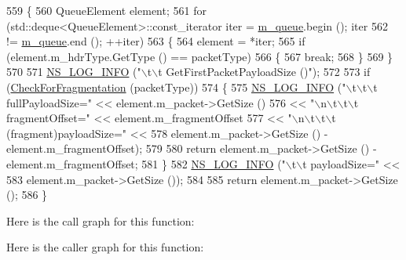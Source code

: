 \begin{DoxyCode}
559 \{
560   QueueElement element;
561   \textcolor{keywordflow}{for} (std::deque<QueueElement>::const\_iterator iter = \hyperlink{classns3_1_1WimaxMacQueue_ad372c20acfe0acf6df6280662d63bdae}{m\_queue}.begin (); iter
562        != \hyperlink{classns3_1_1WimaxMacQueue_ad372c20acfe0acf6df6280662d63bdae}{m\_queue}.end (); ++iter)
563     \{
564       element = *iter;
565       \textcolor{keywordflow}{if} (element.m\_hdrType.GetType () == packetType)
566         \{
567           \textcolor{keywordflow}{break};
568         \}
569     \}
570 
571   \hyperlink{group__logging_gafbd73ee2cf9f26b319f49086d8e860fb}{NS\_LOG\_INFO} (\textcolor{stringliteral}{"\(\backslash\)t\(\backslash\)t GetFirstPacketPayloadSize ()"});
572 
573   \textcolor{keywordflow}{if} (\hyperlink{classns3_1_1WimaxMacQueue_aba14f6efd4ebb33ac03afd4bbc1461b6}{CheckForFragmentation} (packetType))
574     \{
575       \hyperlink{group__logging_gafbd73ee2cf9f26b319f49086d8e860fb}{NS\_LOG\_INFO} (\textcolor{stringliteral}{"\(\backslash\)t\(\backslash\)t\(\backslash\)t fullPayloadSize="} << element.m\_packet->GetSize ()
576                                              << \textcolor{stringliteral}{"\(\backslash\)n\(\backslash\)t\(\backslash\)t\(\backslash\)t fragmentOffset="} << element.m\_fragmentOffset
577                                              << \textcolor{stringliteral}{"\(\backslash\)n\(\backslash\)t\(\backslash\)t\(\backslash\)t (fragment)payloadSize="} <<
578                    element.m\_packet->GetSize () - element.m\_fragmentOffset);
579 
580       \textcolor{keywordflow}{return} element.m\_packet->GetSize () - element.m\_fragmentOffset;
581     \}
582   \hyperlink{group__logging_gafbd73ee2cf9f26b319f49086d8e860fb}{NS\_LOG\_INFO} (\textcolor{stringliteral}{"\(\backslash\)t\(\backslash\)t payloadSize="} <<
583                element.m\_packet->GetSize ());
584 
585   \textcolor{keywordflow}{return} element.m\_packet->GetSize ();
586 \}
\end{DoxyCode}


Here is the call graph for this function\+:




Here is the caller graph for this function\+:



